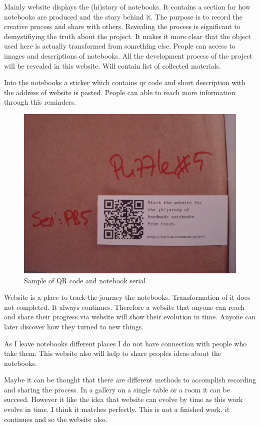 Mainly website displays the (hi)story of notebooks. It contains a section for how notebooks are produced and the story behind it. The purpose is to record the creative process and share with others. Revealing the process is significant to demystifiying the truth about the project. It makes it more clear that the object used here is actually transformed from something else. People can access to images and descriptions of notebooks. All the development process of the project will be revealed in this website. Will contain list of collected materials. 

Into the notebooks a sticker which contains qr code and short description with the address of website is pasted. People can able to reach more information through this reminders. 

\begin{figure}[h!]
  \centering
  \includegraphics[width=1\textwidth]{project_graphics/qr_serial.jpg}
  \caption{Sample of QR code and notebook serial}
  \label{fig:Banner_1}
\end{figure}

Website is a place to track the journey the notebooks. Transformation of it does not completed. It always continues. Therefore a website that anyone can reach and share their progress via website will show their evolution in time. Anyone can later discover how they turned to new things.

As I leave notebooks different places I do not have connection with people who take them. This website also will help to share peoples ideas about the notebooks.

Maybe it can be thought that there are different methods to accomplish recording and sharing the process. In a gallery on a single table or a room it can be succeed. However it like the idea that website can evolve by time as this work evolve in time. I think it matches perfectly. This is not a finished work, it continues and so the website also.

